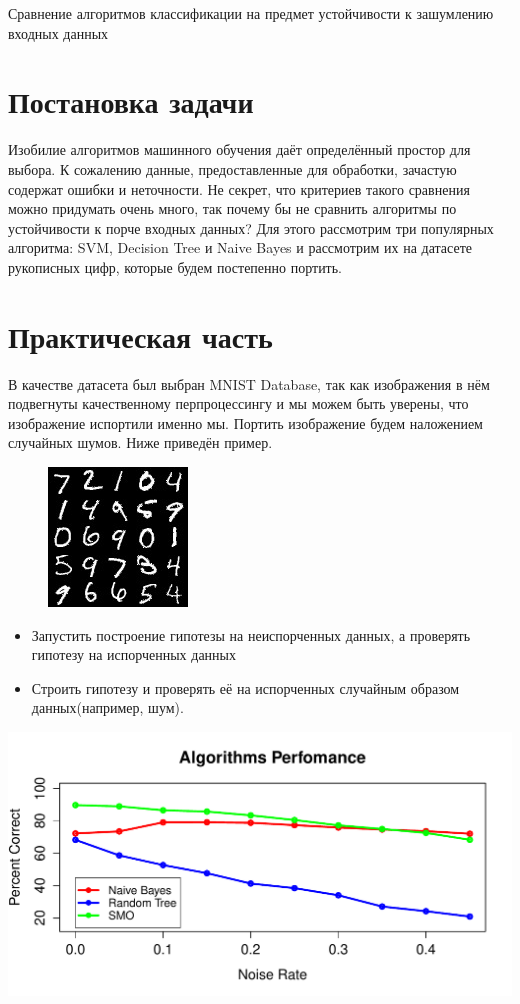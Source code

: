 \documentclass{article}
\begin{document}
\begin{center}
\large{Сравнение алгоритмов классификации на предмет устойчивости к зашумлению входных данных}
\end{center}
\newpage
\section{Постановка задачи}
Изобилие алгоритмов машинного обучения даёт определённый простор для выбора. К сожалению данные, предоставленные для обработки, зачастую содержат ошибки и неточности. Не секрет, что критериев такого сравнения можно придумать очень много, так почему бы не сравнить алгоритмы по устойчивости к порче входных данных? Для этого рассмотрим три популярных алгоритма: SVM, Decision Tree и Naive Bayes и рассмотрим их на датасете рукописных цифр, которые будем постепенно портить.
\section{Практическая часть}
В качестве датасета был выбран MNIST Database, так как изображения в нём подвегнуты качественному перпроцессингу и мы можем быть уверены, что изображение испортили именно мы. Портить изображение будем наложением случайных шумов. Ниже приведён пример.

\centering
\begin{figure}
	\includegraphics[width=.3\textwidth]{graphics/digits.jpg} 
\end{figure}
\begin{itemize}
\item Запустить построение гипотезы на неиспорченных данных, а проверять гипотезу на испорченных данных
\item Строить гипотезу и проверять её на испорченных случайным образом данных(например, шум). 
\end{itemize}
\includegraphics[width=\textwidth]{graphics/perfomance1.pdf}
\end{document}
